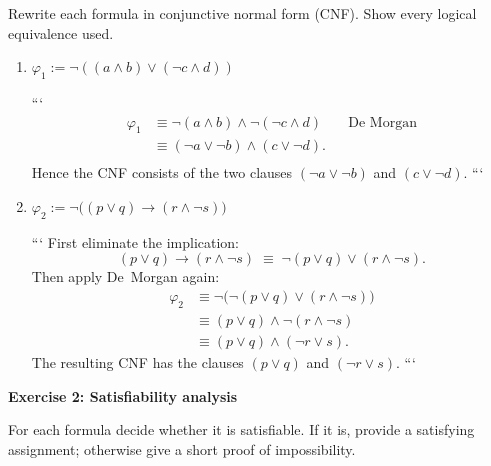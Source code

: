 \documentclass{article}
\theoremstyle{theorem}
\theoremstyle{definition}
\theoremstyle{remark}
\begin{document}
Rewrite each formula in conjunctive normal form (CNF).  Show every logical equivalence used.

\begin{enumerate}
\item $\varphi_1 := \neg((a \land b) \lor (\neg c \land d))$

```
    \begin{align*}
      \varphi_1
        &\equiv \neg(a \land b) \land \neg(\neg c \land d) && \text{De~Morgan}\\
        &\equiv (\neg a \lor \neg b) \land (c \lor \neg d).\\[-6pt]
    \end{align*}
    Hence the CNF consists of the two clauses $(\neg a \lor \neg b)$ and $(c \lor \neg d)$.
```

\item $\varphi_2 := \neg\bigl((p \lor q) \rightarrow (r \land \neg s)\bigr)$

```
    First eliminate the implication:
    \[(p \lor q) \rightarrow (r \land \neg s)\;\equiv\; \neg(p \lor q) \lor (r \land \neg s).\]
    Then apply De~Morgan again:
    \begin{align*}
      \varphi_2
        &\equiv \neg\bigl(\neg(p \lor q) \lor (r \land \neg s)\bigr)\\
        &\equiv (p \lor q) \land \neg(r \land \neg s)\\
        &\equiv (p \lor q) \land (\neg r \lor s).
    \end{align*}
    The resulting CNF has the clauses $(p \lor q)$ and $(\neg r \lor s)$.
```

\end{enumerate}


\bigskip
\textbf{Exercise 2: Satisfiability analysis}

For each formula decide whether it is satisfiable.  
If it is, provide a satisfying assignment; otherwise give a short proof of impossibility.
\end{document}
